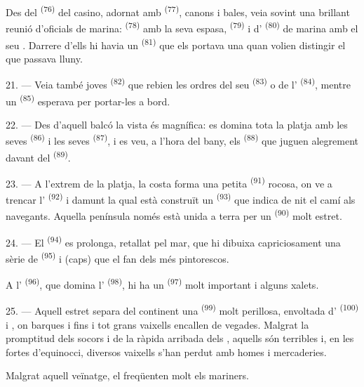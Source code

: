 Des del  \textsuperscript{(76)} del casino, adornat amb
 \textsuperscript{(77)}, canons i bales, veia sovint una brillant
reunió d'oficials de marina:  \textsuperscript{(78)} amb
la seva espasa,  \textsuperscript{(79)} i
d' \textsuperscript{(80)} de marina amb el seu .
Darrere d'ells hi havia un  \textsuperscript{(81)} que els portava
una  quan volien distingir el que passava lluny.

21. --- Veia també joves  \textsuperscript{(82)} que
rebien les ordres del seu  \textsuperscript{(83)} o de
l' \textsuperscript{(84)}, mentre un 
\textsuperscript{(85)} esperava per portar-les a bord.

22. --- Des d'aquell balcó la vista és magnífica: es domina tota la platja amb les
seves  \textsuperscript{(86)} i les seves 
\textsuperscript{(87)}, i es veu, a l'hora del bany, els 
\textsuperscript{(88)} que juguen alegrement davant del 
\textsuperscript{(89)}.

23. --- A l'extrem de la platja, la costa forma una petita 
\textsuperscript{(91)} rocosa, on ve a trencar l'
\textsuperscript{(92)} i damunt la qual està construït un 
\textsuperscript{(93)} que indica de nit el camí als navegants. Aquella península
només està unida a terra per un  \textsuperscript{(90)} molt
estret.

\VUsaut{3.0mm}
\VUsaut{3.0mm}

24. --- El  \textsuperscript{(94)} es prolonga, retallat pel mar, que
hi dibuixa capriciosament una sèrie de  \textsuperscript{(95)} i
 (caps) que el fan dels més pintorescos.

A l' \textsuperscript{(96)}, que domina l'
\textsuperscript{(98)}, hi ha un  \textsuperscript{(97)} molt
important i alguns xalets.

25. --- Aquell estret separa del continent una 
\textsuperscript{(99)} molt perillosa, envoltada d'
\textsuperscript{(100)} i , on barques i fins i tot grans
vaixells encallen de vegades. Malgrat la promptitud dels socors i de la ràpida
arribada dels , aquells  són terribles
i, en les fortes  d'equinocci, diversos vaixells s'han perdut
amb homes i mercaderies.

Malgrat aquell veïnatge,  el freqüenten molt els mariners.
\VUsaut{6.0mm}
\VUfilet{22mm}
